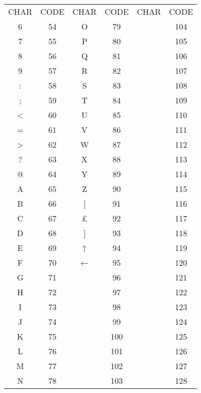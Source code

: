 \begin{tabular}{|cc|cc|cc|}
	CHAR & CODE & CHAR & CODE & CHAR & CODE\\ 

	  6 & 54 & O & 79 & {\petsciifont \smallkey{}} & 104 \\
	  7 & 55 & P & 80 & {\petsciifont \smallkey{}} & 105 \\
	  8 & 56 & Q & 81 & {\petsciifont \smallkey{}} & 106 \\
	  9 & 57 & R & 82 & {\petsciifont \smallkey{}} & 107 \\
	  : & 58 & S & 83 & {\petsciifont \smallkey{}} & 108 \\
	  ; & 59 & T & 84 & {\petsciifont \smallkey{}} & 109 \\
	  < & 60 & U & 85 & {\petsciifont \smallkey{}} & 110 \\
	  = & 61 & V & 86 & {\petsciifont \smallkey{}} & 111 \\
	  > & 62 & W & 87 & {\petsciifont \smallkey{}} & 112 \\
	  ? & 63 & X & 88 & {\petsciifont \smallkey{}} & 113 \\
	  {\ttfamily @} & 64 & Y & 89 & {\petsciifont \smallkey{}} & 114 \\
	  A & 65 & Z & 90 & {\petsciifont \smallkey{}} & 115 \\
	  B & 66 & [ & 91 & {\petsciifont \smallkey{}} & 116 \\
	  C & 67 & £ & 92 & {\petsciifont \smallkey{}} & 117 \\
	  D & 68 & ] & 93 & {\petsciifont \smallkey{}} & 118 \\
	  E & 69 & {\ttfamily ↑} & 94 & {\petsciifont \smallkey{}} & 119 \\
	  F & 70 & {\ttfamily ←} & 95 & {\petsciifont \smallkey{}} & 120 \\
	  G & 71 & {\petsciifont \smallkey{}} & 96 & {\petsciifont \smallkey{}} & 121 \\
	  H & 72 & {\petsciifont \smallkey{}} & 97 & {\petsciifont \smallkey{}} & 122 \\
	  I & 73 & {\petsciifont \smallkey{}} & 98 & {\petsciifont \smallkey{}} & 123 \\
	  J & 74 & {\petsciifont \smallkey{}} & 99 & {\petsciifont \smallkey{}} & 124 \\
	  K & 75 & {\petsciifont \smallkey{}} & 100 & {\petsciifont \smallkey{}} & 125 \\
	  L & 76 & {\petsciifont \smallkey{}} & 101 & {\petsciifont \smallkey{}} & 126 \\
	  M & 77 & {\petsciifont \smallkey{}} & 102 & {\petsciifont \smallkey{}} & 127 \\
	  N & 78 & {\petsciifont \smallkey{}} & 103 &  & 128 \\
\end{tabular}

